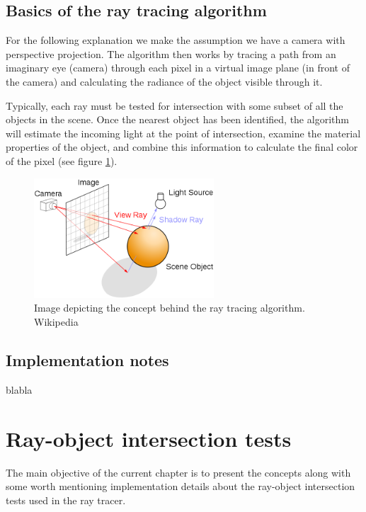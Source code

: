 \documentclass{article}
\begin{document}
\subsection{Basics of the ray tracing algorithm}
For the following explanation we make the assumption we have a camera with perspective projection. The algorithm then works by tracing a path from an imaginary eye (camera) through each pixel in a virtual image plane (in front of the camera) and calculating the radiance of the object visible through it.

Typically, each ray must be tested for intersection with some subset of all the objects in the scene. Once the nearest object has been identified, the algorithm will estimate the incoming light at the point of intersection, examine the material properties of the object, and combine this information to calculate the final color of the pixel (see figure \ref{fig:concept}). 

\begin{figure}[h]
	\centering
    \includegraphics[width=0.6\textwidth]{ray_trace_algo}
	\caption{Image depicting the concept behind the ray tracing algorithm. Wikipedia}
    \label{fig:concept}
\end{figure}

\subsection{Implementation notes}

blabla


\section{Ray-object intersection tests}
\label{sec:isects}
The main objective of the current chapter is to present the concepts along with some worth mentioning implementation details about the ray-object intersection tests used in the ray tracer.
\end{document}
